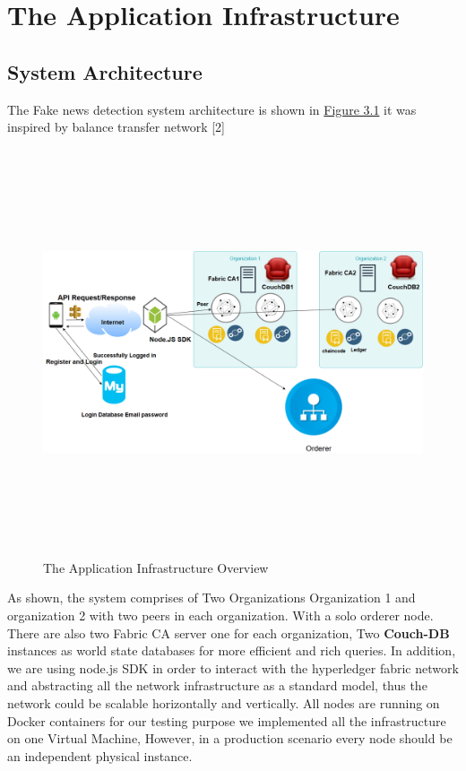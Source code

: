 \chapter{The Application Infrastructure}

\section{System Architecture}

The Fake news detection system architecture is shown in \hyperref[fig:infrastructure]{Figure 3.1} it was inspired by balance transfer network [2]
 \begin{figure}[H]
\includegraphics[width=15cm,height=12cm]{images/infrastructure.png}
\caption{The Application Infrastructure Overview}
\label{fig:infrastructure}
\end{figure}
\cleardoublepage

As shown, the system comprises of Two Organizations Organization 1 and organization 2 with two peers in each organization. 
With a solo orderer node.  There are also two Fabric CA server one for each organization, Two \textbf{Couch-DB} instances as world state databases for more efficient and rich queries. 
In addition, we are using node.js SDK in order to interact with the hyperledger fabric network and abstracting all the network infrastructure as a standard model, thus the network could be scalable horizontally and vertically. All nodes are running on Docker containers for our testing purpose we implemented all the infrastructure on one Virtual Machine, However, in a production scenario every node should be an independent physical instance. \\ 

